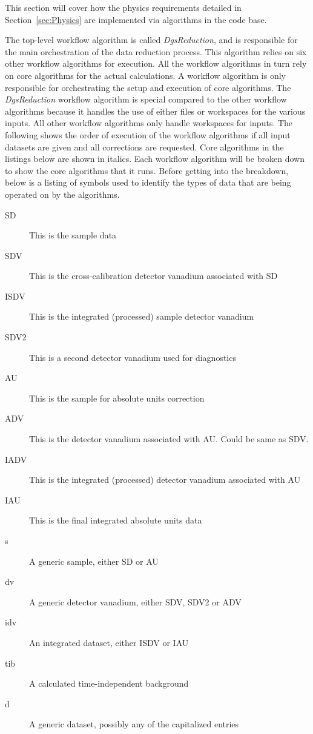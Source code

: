 This section will cover how the physics requirements detailed in Section~\ref{sec:Physics} are implemented via algorithms in the \mantid{} code base.

The top-level workflow algorithm is called \textit{DgsReduction}, and is responsible for the main orchestration of the data reduction process. This algorithm relies on six other workflow algorithms for execution. All the workflow algorithms in turn rely on core \mantid{} algorithms for the actual calculations. A workflow algorithm is only responsible for orchestrating the setup and execution of core \mantid{} algorithms. The \textit{DgsReduction} workflow algorithm is special compared to the other workflow algorithms because it handles the use of either files or workspaces for the various inputs. All other workflow algorithms only handle workspaces for inputs. The following shows the order of execution of the workflow algorithms if all input datasets are given and all corrections are requested. Core \mantid{} algorithms in the listings below are shown in italics. Each workflow algorithm will be broken down to show the core algorithms that it runs. Before getting into the breakdown, below is a listing of symbols used to identify the types of data that are being operated on by the algorithms.

\begin{description}
\item[SD] This is the sample data
\item[SDV] This is the cross-calibration detector vanadium associated with SD
\item[ISDV] This is the integrated (processed) sample detector vanadium
\item[SDV2] This is a second detector vanadium used for diagnostics
\item[AU] This is the sample for absolute units correction
\item[ADV] This is the detector vanadium associated with AU. Could be same as SDV.
\item[IADV] This is the integrated (processed) detector vanadium associated with AU
\item[IAU] This is the final integrated absolute units data
\item[s] A generic sample, either SD or AU
\item[dv] A generic detector vanadium, either SDV, SDV2 or ADV
\item[idv] An integrated dataset, either ISDV or IAU
\item[tib] A calculated time-independent background
\item[d] A generic dataset, possibly any of the capitalized entries
\end{description}

